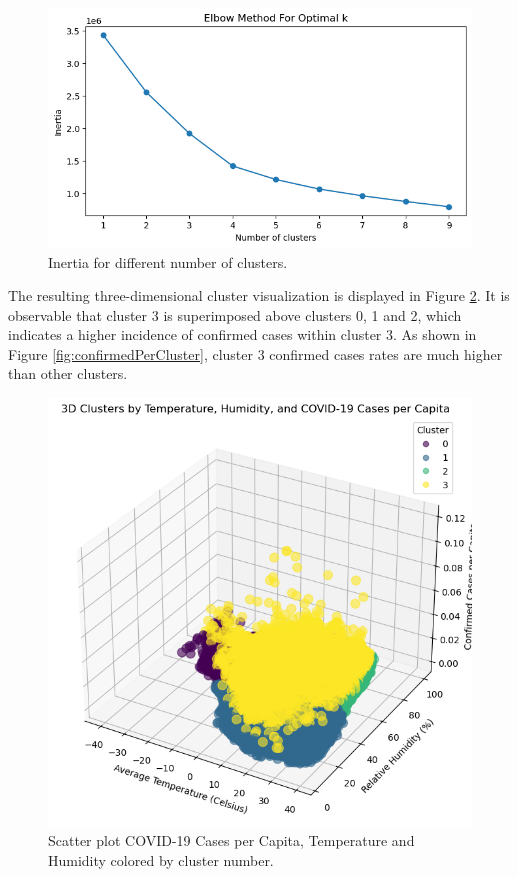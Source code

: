 \documentclass[sigconf,screen,nonacm]{acmart}
\begin{document}
\begin{figure}[H]
  \centering
  \includegraphics[width=\linewidth]{Figures/Interia.png}
  \caption{Inertia for different number of clusters.}
  \label{fig:Intertia}
\end{figure}

The resulting three-dimensional cluster visualization is displayed in Figure \ref{fig:3D-Cluster}. It is observable that cluster 3 is superimposed above clusters 0, 1 and 2, which indicates a higher incidence of confirmed cases within cluster 3. As shown in Figure \ref{fig:confirmedPerCluster}, cluster 3 confirmed cases rates are much higher than other clusters. 

\begin{figure}[H]
  \centering
  \includegraphics[width=\linewidth]{Figures/3DClusters.PNG}
  \caption{Scatter plot COVID-19 Cases per Capita, Temperature and Humidity colored by cluster number.}
  \label{fig:3D-Cluster}
\end{figure}
\end{document}
